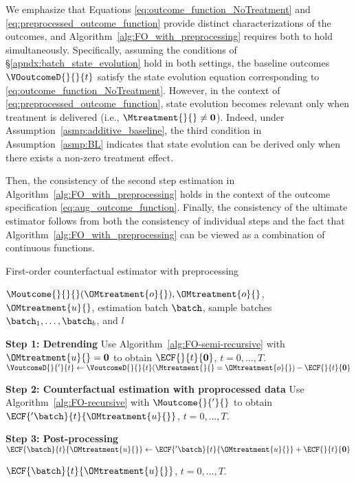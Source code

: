 % 
We emphasize that Equations \eqref{eq:outcome_function_NoTreatment} and \eqref{eq:preprocessed_outcome_function} provide distinct characterizations of the outcomes, and Algorithm~\ref{alg:FO_with_preprocessing} requires both to hold simultaneously. Specifically, assuming the conditions of \S\ref{apndx:batch_state_evolution} hold in both settings, the baseline outcomes $\VOoutcomeD{}{}{t}$ satisfy the state evolution equation corresponding to \eqref{eq:outcome_function_NoTreatment}. However, in the context of \eqref{eq:preprocessed_outcome_function}, state evolution becomes relevant only when treatment is delivered (i.e., $\Mtreatment{}{} \neq \mathbf{0}$). Indeed, under Assumption~\ref{asmp:additive_baseline}, the third condition in Assumption~\ref{asmp:BL} indicates that state evolution can be derived only when there exists a non-zero treatment effect.

Then, the consistency of the second step estimation in Algorithm~\ref{alg:FO_with_preprocessing} holds in the context of the outcome specification \eqref{eq:aug_outcome_function}. Finally, the consistency of the ultimate estimator follows from both the consistency of individual steps and the fact that Algorithm~\ref{alg:FO_with_preprocessing} can be viewed as a combination of continuous functions.



% 
\begin{algorithm}
\caption{First-order counterfactual estimator with preprocessing}
\label{alg:FO_with_preprocessing}
% 
\begin{algorithmic}
% 
\Require $\Moutcome{}{}{}(\OMtreatment{o}{}), \OMtreatment{o}{}$, $\OMtreatment{u}{}$, estimation batch $\batch$, sample batches $\batch_1, \ldots, \batch_b$, and $l$

\State \hspace{-1.3em} \textbf{Step 1: Detrending}
% 
\State Use Algorithm~\ref{alg:FO-semi-recursive} with $\OMtreatment{u}{} = \mathbf{0}$ to obtain $\ECF{}{t}{\mathbf{0}}$, $t = 0, \ldots, T$. 
% 
    \State $\VoutcomeD{}{'}{t} \gets \VoutcomeD{}{}{t}(\Mtreatment{}{}=\OMtreatment{o}{}) - \ECF{}{t}{\mathbf{0}}$
\EndFor

\State \hspace{-1.3em} \textbf{Step 2: Counterfactual estimation with proprocessed data}
% 
\State Use Algorithm~\ref{alg:FO-recursive} with $\Moutcome{}{'}{}$ to obtain $\ECF{'\batch}{t}{\OMtreatment{u}{}}$, $t = 0, \ldots, T$.


\State \hspace{-1.3em} \textbf{Step 3: Post-processing}
% 
    \State $\ECF{\batch}{t}{\OMtreatment{u}{}} \gets \ECF{'\batch}{t}{\OMtreatment{u}{}} + \ECF{}{t}{\mathbf{0}}$
\EndFor

\Ensure $\ECF{\batch}{t}{\OMtreatment{u}{}}$, $t = 0, \ldots, T$.
% 
\end{algorithmic}
\end{algorithm}
% 





